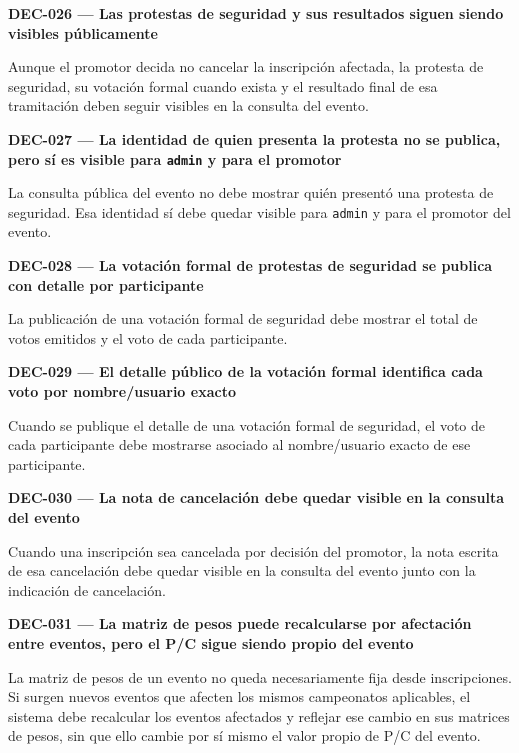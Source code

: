 \documentclass[10pt,letterpaper]{article}
\begin{document}
\noindent\textbf{DEC-026 --- Las protestas de seguridad y sus resultados siguen siendo visibles públicamente}\par
Aunque el promotor decida no cancelar la inscripción afectada, la protesta de seguridad, su votación formal cuando exista y el resultado final de esa tramitación deben seguir visibles en la consulta del evento.\par\vspace{0.45em}
\noindent\textbf{DEC-027 --- La identidad de quien presenta la protesta no se publica, pero sí es visible para \texttt{admin} y para el promotor}\par
La consulta pública del evento no debe mostrar quién presentó una protesta de seguridad. Esa identidad sí debe quedar visible para \texttt{admin} y para el promotor del evento.\par\vspace{0.45em}
\noindent\textbf{DEC-028 --- La votación formal de protestas de seguridad se publica con detalle por participante}\par
La publicación de una votación formal de seguridad debe mostrar el total de votos emitidos y el voto de cada participante.\par\vspace{0.45em}
\noindent\textbf{DEC-029 --- El detalle público de la votación formal identifica cada voto por nombre/usuario exacto}\par
Cuando se publique el detalle de una votación formal de seguridad, el voto de cada participante debe mostrarse asociado al nombre/usuario exacto de ese participante.\par\vspace{0.45em}
\noindent\textbf{DEC-030 --- La nota de cancelación debe quedar visible en la consulta del evento}\par
Cuando una inscripción sea cancelada por decisión del promotor, la nota escrita de esa cancelación debe quedar visible en la consulta del evento junto con la indicación de cancelación.\par\vspace{0.45em}
\noindent\textbf{DEC-031 --- La matriz de pesos puede recalcularse por afectación entre eventos, pero el P/C sigue siendo propio del evento}\par
La matriz de pesos de un evento no queda necesariamente fija desde inscripciones. Si surgen nuevos eventos que afecten los mismos campeonatos aplicables, el sistema debe recalcular los eventos afectados y reflejar ese cambio en sus matrices de pesos, sin que ello cambie por sí mismo el valor propio de P/C del evento.\par\vspace{0.45em}
\end{document}
